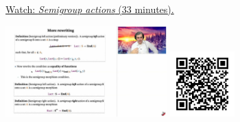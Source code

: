 
\begin{minipage}{10cm}
    \href{https://act4e-spring21.netlify.app/videos/spring2021-actions:semi-actions.html}{Watch: \emph{Semigroup actions} (33 minutes).}
        
    \href{https://act4e-spring21.netlify.app/videos/spring2021-actions:semi-actions.html}{\includegraphics[height=3.5cm]{spring2021-actions:semi-actions/thumbnails.jpg}}
    \href{https://act4e-spring21.netlify.app/videos/spring2021-actions:semi-actions.html}{\includegraphics[height=2.5cm]{spring2021-actions:semi-actions/qrcode.png}}
\end{minipage}
